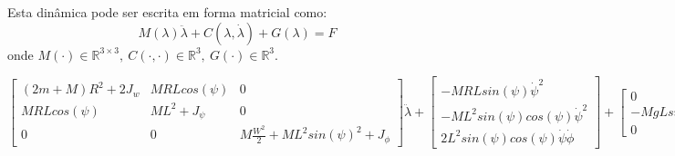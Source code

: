 \documentclass[10pt]{article}
\begin{document}
\quad Esta dinâmica pode ser escrita em forma matricial como:
\begin{equation}
    M(\lambda) \ddot{\lambda} + C(\lambda, \dot{\lambda}) + G(\lambda) = F
\end{equation}
onde $M(\cdot) \in \mathbb{R}^{3 \times 3}, \ C(\cdot, \cdot) \in \mathbb{R}^3, \ G(\cdot) \in \mathbb{R}^3$.

\begin{equation}
    \begin{bmatrix}
        (2m + M)R^2 + 2J_w & MRLcos(\psi) & 0 \\
        MRLcos(\psi) & ML^2 + J_\psi & 0 \\
        0 & 0 & M\frac{W^2}{2}+ML^2sin(\psi)^2+J_\phi
    \end{bmatrix} \ddot{\lambda}+
    \begin{bmatrix}
        - MRLsin(\psi)\dot{\psi}^2 \\
        - ML^2sin(\psi)cos(\psi)\dot{\psi}^2 \\
        2L^2sin(\psi)cos(\psi)\dot\psi\dot\phi
    \end{bmatrix} +
    \begin{bmatrix}
        0 \\
        - MgLsin(\psi) \\
        0
    \end{bmatrix} = F
\end{equation}
\end{document}
